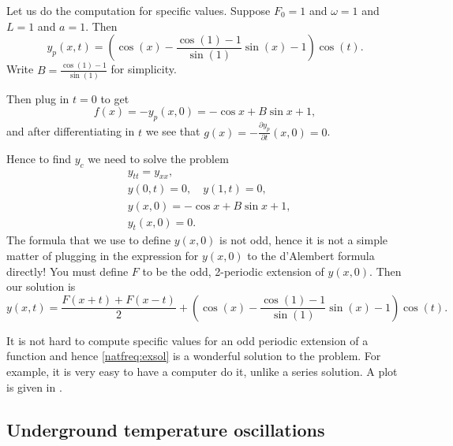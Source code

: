 \begin{example}
Let us do the computation for specific values.
Suppose $F_0 = 1$ and $\omega = 1$ and $L=1$ and $a=1$.  Then 
\begin{equation*}
y_p(x,t) =
\left(
\cos (x) -
\frac{\cos (1) - 1}{\sin (1)}
\sin (x)
-1
\right)
\cos (t) .
\end{equation*}
Write $B = \frac{\cos (1) - 1}{\sin (1)}$ for simplicity.

Then plug in $t=0$ to get
\begin{equation*}
f(x) =- y_p(x,0) = 
- \cos x +
B \sin x
+1 ,
\end{equation*}
and after differentiating in $t$ we see that 
$g(x) = -\frac{\partial y_p}{\partial t}(x,0) = 0$.

Hence to find $y_c$ we need to solve the problem
\begin{align*}
& y_{tt} = y_{xx} , \\
& y(0,t) = 0 , \quad y(1,t) = 0 , \\
& y(x,0) = - \cos x + B \sin x +1 , \\
& y_t(x,0) = 0 .
\end{align*}
The formula that we use to define $y(x,0)$ is not odd,
hence it is not a simple matter of plugging in the expression for $y(x,0)$
to the d'Alembert
formula directly!  You must define $F$ to be the odd, 2-periodic
extension of $y(x,0)$.  Then our solution is
\begin{equation} \label{natfreq:exsol}
y(x,t) = 
\frac{F(x+t) + F(x-t)}{2} + 
\left(
\cos (x) -
\frac{\cos (1) - 1}{\sin (1)}
\sin (x)
-1
\right)
\cos (t) .
\end{equation}

It is not hard to compute specific values
for an odd periodic extension of a function and
hence \eqref{natfreq:exsol} is a wonderful solution to the problem.
For example, it is very easy to have a computer do it, unlike a series solution.
A plot is given in .
\begin{myfig}
\capstart
{}
\caption{Plot of $y(x,t) = \frac{F(x+t) + F(x-t)}{2} + \left( \cos (x) -
\frac{\cos (1) - 1}{\sin (1)} \sin (x) -1 \right) \cos (t)$.%
\label{natfreq:forcedvibfig}}
\end{myfig}
\end{example}

\subsection{Underground temperature oscillations}

